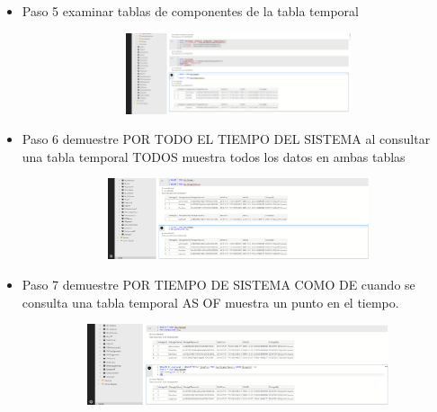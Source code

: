 \begin{itemize}
				 \item Paso 5 examinar tablas de componentes de la tabla temporal
				 
				 
				 \begin{center}
    				\includegraphics[width=16cm, height=90]{./Imagenes/Imagen4}
   				    \end{center}
   				    \clearpage		
   				    
   				 \item Paso 6 demuestre POR TODO EL TIEMPO DEL SISTEMA al consultar una tabla temporal TODOS muestra todos los datos en ambas tablas
				 
				 
				 \begin{center}
    				\includegraphics[width=16cm, height=90]{./Imagenes/Imagen5}
   				    \end{center}   		 
				 
				  \item Paso 7 demuestre POR TIEMPO DE SISTEMA COMO DE cuando se consulta una tabla temporal AS OF muestra un punto en el tiempo.
				 
				 \begin{center}
    				\includegraphics[width=16cm, height=90]{./Imagenes/Imagen6}
   				    \end{center} 
   				    

\end{itemize}
